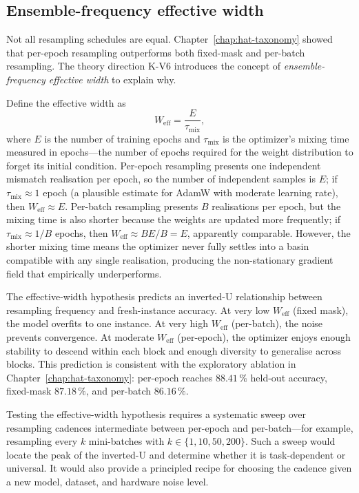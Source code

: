 \subsection{Ensemble-frequency effective width}
\label{subsec:effective-width}

Not all resampling schedules are equal.  Chapter~\ref{chap:hat-taxonomy} showed that per-epoch resampling outperforms both fixed-mask and per-batch resampling.  The theory direction K-V6 introduces the concept of \emph{ensemble-frequency effective width} to explain why.

Define the effective width as
\begin{equation}
    W_{\mathrm{eff}}
    = \frac{E}{\tau_{\mathrm{mix}}},
    \label{eq:effective-width}
\end{equation}
where $E$ is the number of training epochs and $\tau_{\mathrm{mix}}$ is the optimizer's mixing time measured in epochs---the number of epochs required for the weight distribution to forget its initial condition.  Per-epoch resampling presents one independent mismatch realisation per epoch, so the number of independent samples is $E$; if $\tau_{\mathrm{mix}} \approx 1$ epoch (a plausible estimate for AdamW with moderate learning rate), then $W_{\mathrm{eff}} \approx E$.  Per-batch resampling presents $B$ realisations per epoch, but the mixing time is also shorter because the weights are updated more frequently; if $\tau_{\mathrm{mix}} \approx 1/B$ epochs, then $W_{\mathrm{eff}} \approx B E / B = E$, apparently comparable.  However, the shorter mixing time means the optimizer never fully settles into a basin compatible with any single realisation, producing the non-stationary gradient field that empirically underperforms.

The effective-width hypothesis predicts an inverted-U relationship between resampling frequency and fresh-instance accuracy.  At very low $W_{\mathrm{eff}}$ (fixed mask), the model overfits to one instance.  At very high $W_{\mathrm{eff}}$ (per-batch), the noise prevents convergence.  At moderate $W_{\mathrm{eff}}$ (per-epoch), the optimizer enjoys enough stability to descend within each block and enough diversity to generalise across blocks.  This prediction is consistent with the exploratory ablation in Chapter~\ref{chap:hat-taxonomy}: per-epoch reaches $88.41\,\%$ held-out accuracy, fixed-mask $87.18\,\%$, and per-batch $86.16\,\%$.

Testing the effective-width hypothesis requires a systematic sweep over resampling cadences intermediate between per-epoch and per-batch---for example, resampling every $k$ mini-batches with $k \in \{1, 10, 50, 200\}$.  Such a sweep would locate the peak of the inverted-U and determine whether it is task-dependent or universal.  It would also provide a principled recipe for choosing the cadence given a new model, dataset, and hardware noise level.

